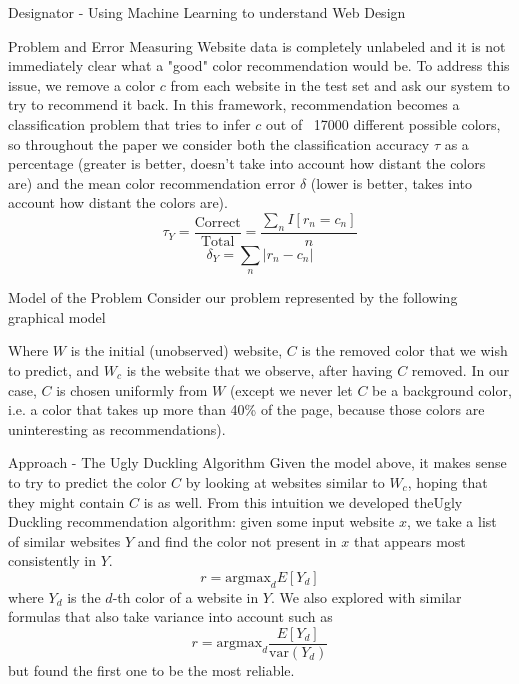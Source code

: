 \documentclass{beamer}
\begin{document}
\begin{frame}{\centerline{\Huge Designator - Using Machine Learning to understand Web Design}}
\begin{textblock}{5}
\begin{block}{Problem and Error Measuring}
Website data is completely unlabeled and it is not immediately clear what a "good" color recommendation would be. To address this issue, we remove a color $c$ from each website in the test set and ask our system to try to recommend it back. In this framework, recommendation becomes a classification problem that tries to infer $c$ out of ~17000 different possible colors, so throughout the paper we consider both the classification accuracy $\tau$ as a percentage (greater is better, doesn't take into account how distant the colors are) and the mean color recommendation error $\delta$ (lower is better, takes into account how distant the colors are).
$$\tau_Y = \frac{\text{Correct}}{\text{Total}} = \frac{\sum_n I[r_n = c_n]}{n}$$
$$\delta_Y = \sum_n |r_n - c_n|$$
\end{block}

\begin{block}{Model of the Problem}
Consider our problem represented by the following graphical model
\begin{figure}
\centering
{}
\end{figure}
Where $W$ is the initial (unobserved) website, $C$ is the removed color that we wish to predict, and $W_c$ is the website
that we observe, after having $C$ removed. In our case, $C$ is chosen uniformly from $W$ (except we never let $C$ be a
background color, i.e. a color that takes up more than 40\% of the page, because those colors are uninteresting as
recommendations).
\end{block}


\begin{block}{Approach - The Ugly Duckling Algorithm}
Given the model above, it makes sense to try to predict the color $C$ by looking at websites similar to $W_c$, hoping
that they might contain $C$ is as well. From this intuition we developed theUgly Duckling recommendation algorithm: given some input website $x$, we take a list of similar websites $Y$ and find the color not present in $x$ that appears most consistently in $Y$.
$$r = \text{argmax}_{d} E[Y_d] $$
where $Y_d$ is the $d$-th color of a website in $Y$. We also explored with similar formulas that also take variance into account such as
$$r = \text{argmax}_{d} \frac{E\left[Y_d\right]}{\text{var}(Y_d)} $$
but found the first one to be the most reliable.


\end{block}
\end{textblock}
\end{frame}
\end{document}
